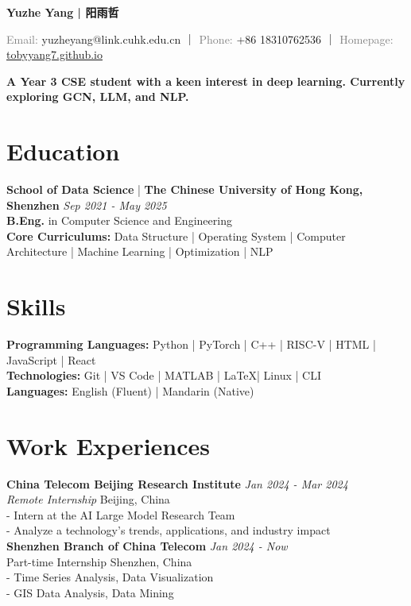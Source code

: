 \documentclass[a4paper,10pt]{article}
\newcommand{\contact}[2]{\noindent\textcolor{gray}{#1:} #2}
\begin{document}
\newcommand{\name}[1]{\noindent\textbf{\LARGE #1}\vspace{0.5em}}

\begin{center}
    
\name{Yuzhe Yang | 阳雨哲}

\contact{Email}{yuzheyang@link.cuhk.edu.cn} ｜ \contact{Phone}{+86 18310762536} ｜ \contact{Homepage}{\href{https://tobyyang7.github.io/}{tobyyang7.github.io}}

\vspace*{.2em}
\textbf{A Year 3 CSE student with a keen interest in deep learning. Currently exploring GCN, LLM, and NLP.\\}

\end{center}

\section*{Education}
\textbf{School of Data Science} | \textbf{The Chinese University of Hong Kong, Shenzhen} \hfill \textit{Sep 2021 - May 2025}\\
\textbf{B.Eng.} in Computer Science and Engineering\\
\textbf{Core Curriculums:}
Data Structure | Operating System |  Computer Architecture |  Machine Learning | Optimization |  NLP


\section*{Skills}
\textbf{Programming Languages:} Python | PyTorch | C++ | RISC-V | HTML | JavaScript |  React\\
\textbf{Technologies:} Git | VS Code | MATLAB | \LaTeX | Linux | CLI\\
\textbf{Languages:} English (Fluent) | Mandarin (Native)

\section*{Work Experiences}
\textbf{China Telecom Beijing Research Institute} \hfill \textit{Jan 2024 - Mar 2024}\\
\textit{Remote Internship} \hfill Beijing, China\\
- Intern at the AI Large Model Research Team\\
- Analyze a technology's trends, applications, and industry impact\\
\textbf{Shenzhen Branch of China Telecom} \hfill \textit{Jan 2024 - Now}\\
Part-time Internship \hfill Shenzhen, China\\
- Time Series Analysis, Data Visualization\\
- GIS Data Analysis, Data Mining
\end{document}
